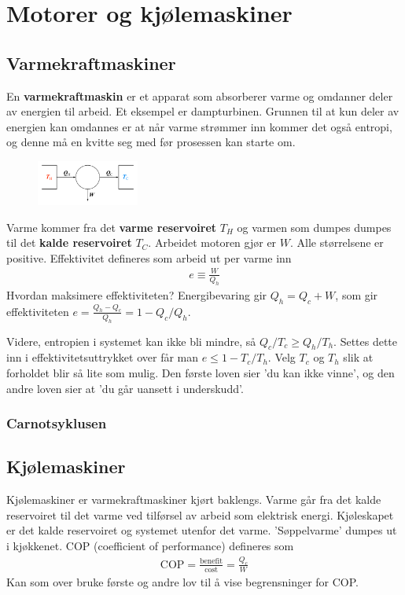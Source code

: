 \documentclass[12pt]{article}
\begin{document}
\section{Motorer og kjølemaskiner}
\subsection{Varmekraftmaskiner}
En \textbf{varmekraftmaskin} er et apparat som absorberer varme og omdanner
deler av energien til arbeid. Et eksempel er dampturbinen. Grunnen til at kun
deler av energien kan omdannes er at når varme strømmer inn kommer det også
entropi, og denne må en kvitte seg med før prosessen kan starte om.
\begin{figure}
  \includegraphics[width=0.3\textwidth]{figures/carnot.png}
\end{figure}
Varme kommer fra det \textbf{varme reservoiret} $T_H$ og varmen som dumpes dumpes til
det \textbf{kalde reservoiret} $T_C$. Arbeidet motoren gjør er $W$. Alle størrelsene er positive.
Effektivitet defineres som arbeid ut per varme inn
\begin{align*}
  e \equiv \frac{W}{Q_h}
\end{align*}
Hvordan maksimere effektiviteten? Energibevaring gir $Q_h = Q_c + W$, som gir
effektiviteten $e = \frac{Q_h - Q_c}{Q_h} = 1 - Q_c/Q_h$.

Videre, entropien i systemet kan ikke bli mindre, så $Q_c / T_c \geq Q_h / T_h$.
Settes dette inn i effektivitetsuttrykket over får man $e \leq 1 - T_c / T_h$.
Velg $T_c$ og $T_h$ slik at forholdet blir så lite som mulig. Den første loven
sier 'du kan ikke vinne', og den andre loven sier at 'du går uansett i underskudd'.
\subsubsection{Carnotsyklusen}

\subsection{Kjølemaskiner}
Kjølemaskiner er varmekraftmaskiner kjørt baklengs. Varme går fra det kalde
reservoiret til det varme ved tilførsel av arbeid som elektrisk energi. Kjøleskapet
er det kalde reservoiret og systemet utenfor det varme. 'Søppelvarme' dumpes ut
i kjøkkenet. COP (coefficient of performance) defineres som
\begin{align*}
  \text{COP} = \frac{\text{benefit}}{\text{cost}} = \frac{Q_c}{W}
\end{align*}
Kan som over bruke første og andre lov til å vise begrensninger for COP.
\end{document}
